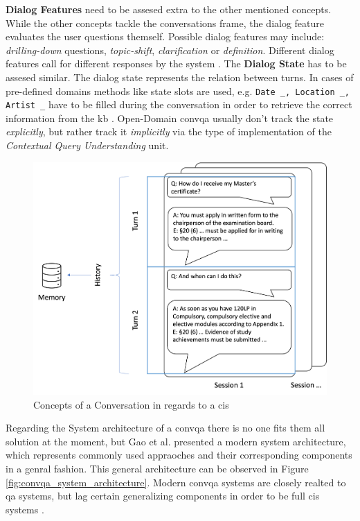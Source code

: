 \textbf{Dialog Features} need to be assesed extra to the other mentioned concepts. While the other concepts tackle the conversations frame, the dialog feature evaluates the user questions themself. Possible dialog features may include: \textit{drilling-down} questions, \textit{topic-shift}, \textit{clarification} or \textit{definition}. Different dialog features call for different responses by the system \cite{gupta_conversational_2020}. The \textbf{Dialog State} has to be assesed similar. The dialog state represents the relation between turns. In cases of pre-defined domains methods like state slots are used, e.g. \verb |Date _, Location _, Artist _| have to be filled during the conversation in order to retrieve the correct information from the \gls{kb} \cite{rastogi_schema-guided_2020}. Open-Domain \gls{convqa} usually don't track the state \textit{explicitly}, but rather track it \textit{implicitly} via the type of implementation of the \textit{Contextual Query Understanding} unit.


\begin{figure}
    \centering
    \includegraphics[width=\textwidth]{Grafiken/Conversation_Explain.png}
    \caption{Concepts of a Conversation in regards to a \gls{cis}}
    \label{fig:conversation_explain}
\end{figure}

Regarding the System architecture of a \gls{convqa} there is no one fits them all solution at the moment, but Gao et al. \cite{gao_neural_2022} presented a modern system architecture, which represents commonly used appraoches and their corresponding components in a genral fashion. This general architecture can be observed in Figure \ref{fig:convqa_system_architecture}. Modern \gls{convqa} systems are closely realted to \gls{qa} systems, but lag certain generalizing components in order to be full \gls{cis} systems \cite{zamani_conversational_2023}.

